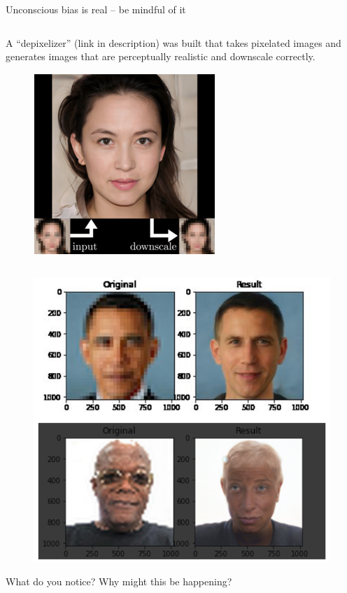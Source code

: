 \documentclass[aspectratio=169]{../latex_main/tntbeamer}  %
\begin{document}
    \begin{frame}{Unconscious bias is real – be mindful of it}
    \begin{colmuns}
        \begin{column}{.4\textwidth}
            A “depixelizer” (link in description) was built that takes pixelated images and generates images that are perceptually realistic and downscale correctly.
            \begin{figure}
                \centering
                \includegraphics[scale=.5]{bild11}
            \end{figure}
        \end{column}
        \begin{column}{.4\textwidth}
            \begin{figure}
                \centering
                \includegraphics[scale=.37]{bild12}
            \end{figure}
            What do you notice? Why might this be happening?
        \end{column}
    \end{colmuns}
    
    \end{frame}
    
\end{document}

